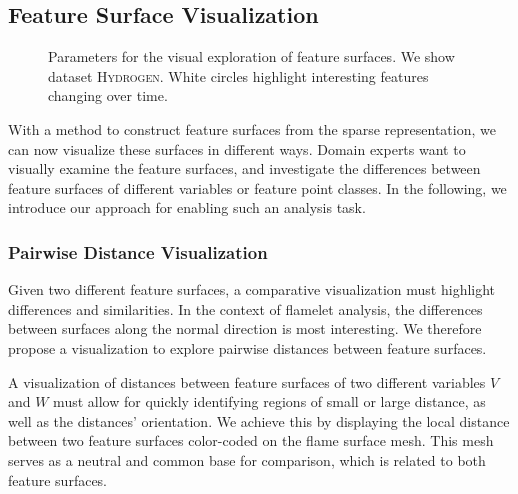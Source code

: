 \subsection{Feature Surface Visualization}
%
\begin{figure}[p]
    \centering
    \setlength\figurewidth\textwidth
    
    \vspace*{-2mm}
    \caption{Parameters for the visual exploration of feature surfaces.
    		We show dataset \textsc{Hydrogen}. White circles highlight
	    	interesting features changing over time. }
    \label{fig:contourmeshvis}
\end{figure}
%
With a method to construct feature surfaces from the sparse representation, we
can now visualize these surfaces in different ways.
%
Domain experts want to visually examine the feature surfaces, and investigate
the differences between feature surfaces of different variables or feature point
classes.
%
In the following, we introduce our approach for enabling such an analysis task.
%
%
\subsubsection{Pairwise Distance Visualization}
%
Given two different feature surfaces, a comparative visualization must highlight
differences and similarities.
%
In the context of flamelet analysis, the differences between surfaces along
the normal direction is most interesting.
%
We therefore propose a visualization to explore pairwise distances between
feature surfaces.
%

%
A visualization of distances between feature surfaces of two different variables
$V$ and $W$ must allow for quickly identifying regions of small or large
distance, as well as the distances' orientation.
%
We achieve this by displaying the local distance
between two feature surfaces color-coded on the flame surface mesh.
%
This mesh serves as a neutral and common base for comparison, which is related
to both feature surfaces.
%

